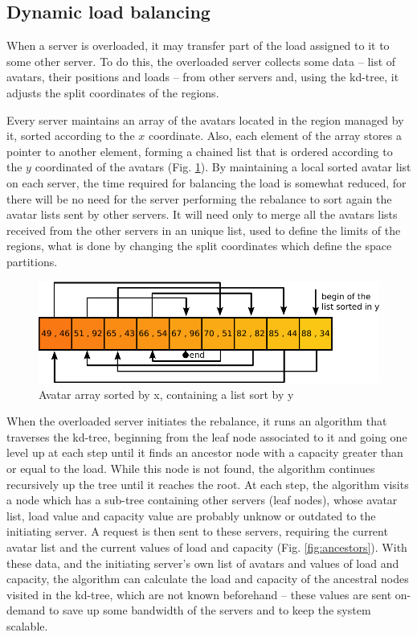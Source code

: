 \documentclass[acmjacm]{acmtrans2m}
\newcommand{\figurecaption}{Fig.}
\begin{document}
\subsection{Dynamic load balancing}

When a server is overloaded, it may transfer part of the load assigned to it to some other server. To do this, the overloaded server collects some data -- list of avatars, their positions and loads -- from other servers and, using the kd-tree, it adjusts the split coordinates of the regions.

Every server maintains an array of the avatars located in the region managed by it, sorted according to the $x$ coordinate. Also, each element of the array stores a pointer to another element, forming a chained list that is ordered according to the $y$ coordinated of the avatars (\figurecaption{} \ref{fig:vectorxlisty}). By maintaining a local sorted avatar list on each server, the time required for balancing the load is somewhat reduced, for there will be no need for the server performing the rebalance to sort again the avatar lists sent by other servers. It will need only to merge all the avatars lists received from the other servers in an unique list, used to define the limits of the regions, what is done by changing the split coordinates which define the space partitions.

\begin{figure}
  \centering
  \includegraphics[width=0.9\linewidth]{images/vectorxlisty}
  \caption{Avatar array sorted by x, containing a list sort by y}
   \label{fig:vectorxlisty}
\end{figure}

When the overloaded server initiates the rebalance, it runs an algorithm that traverses the kd-tree, beginning from the leaf node associated to it and going one level up at each step until it finds an ancestor node with a capacity greater than or equal to the load. While this node is not found, the algorithm continues recursively up the tree until it reaches the root. At each step, the algorithm visits a node which has a sub-tree containing other servers (leaf nodes), whose avatar list, load value and capacity value are probably unknow or outdated to the initiating server. A request is then sent to these servers, requiring the current avatar list and the current values of load and capacity (\figurecaption{} \ref{fig:ancestors}). With these data, and the initiating server's own list of avatars and values of load and capacity, the algorithm can calculate the load and capacity of the ancestral nodes visited in the kd-tree, which are not known beforehand -- these values are sent on-demand to save up some bandwidth of the servers and to keep the system scalable.
\end{document}
